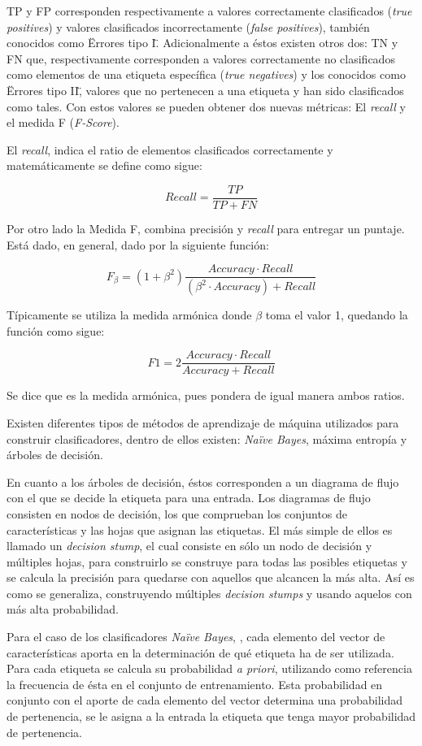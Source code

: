 TP y FP corresponden respectivamente a valores correctamente clasificados (\textit{true positives}) y valores clasificados incorrectamente (\textit{false positives}), también conocidos como \"Errores tipo I\". Adicionalmente a éstos existen otros dos: TN y FN que, respectivamente corresponden a valores correctamente no clasificados como elementos de una etiqueta específica (\textit{true negatives}) y los conocidos como \"Errores tipo II\", valores que no pertenecen a una etiqueta y han sido clasificados como tales. Con estos valores se pueden obtener dos nuevas métricas: El \textit{recall} y el medida F (\textit{F-Score}).

El \textit{recall}, indica el ratio de elementos clasificados correctamente y matemáticamente se define como sigue:

\[
	Recall = \frac{TP}{TP+FN}
\]

Por otro lado la Medida F, combina precisión y \textit{recall} para entregar un puntaje. Está dado, en general, dado por la siguiente función:

\[
	F_{\beta} = (1+\beta^{2})\frac{Accuracy · Recall}{(\beta^{2} · Accuracy) + Recall}
\]

Típicamente se utiliza la medida armónica donde $\beta$ toma el valor 1, quedando la función como sigue:

\[
	F1 = 2\frac{Accuracy · Recall}{ Accuracy + Recall}
\]

Se dice que es la medida armónica, pues pondera de igual manera ambos ratios.

Existen diferentes tipos de métodos de aprendizaje de máquina utilizados para construir clasificadores, dentro de ellos existen: \textit{Naïve Bayes}, máxima entropía y árboles de decisión.

En cuanto a los árboles de decisión, éstos corresponden a un diagrama de flujo con el que se decide la etiqueta para una entrada. Los diagramas de flujo consisten en nodos de decisión, los que comprueban los conjuntos de características y las hojas que asignan las etiquetas. El más simple de ellos es llamado un \textit{decision stump}, el cual consiste en sólo un nodo de decisión y múltiples hojas, para construirlo se construye para todas las posibles etiquetas y se calcula la precisión para quedarse con aquellos que alcancen la más alta. Así es como se generaliza, construyendo múltiples \textit{decision stumps} y usando aquelos con más alta probabilidad.

Para el caso de los clasificadores \textit{Naïve Bayes}, \cite{NaiveBayes2}, cada elemento del vector de características aporta en la determinación de qué etiqueta ha de ser utilizada. Para cada etiqueta se calcula su probabilidad \textit{a priori}, utilizando como referencia la frecuencia de ésta en el conjunto de entrenamiento. Esta probabilidad en conjunto con el aporte de cada elemento del vector determina una probabilidad de pertenencia, se le asigna a la entrada la etiqueta que tenga mayor probabilidad de pertenencia.

